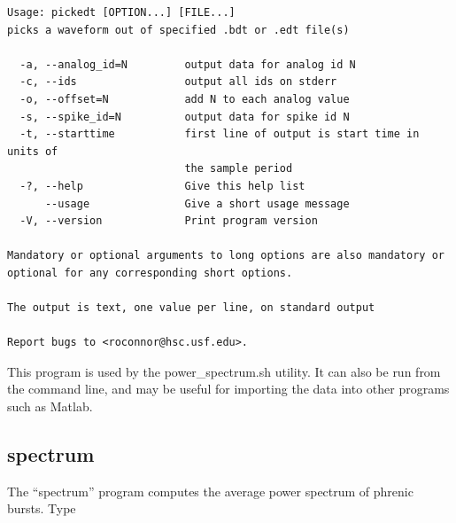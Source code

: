 \documentclass[12pt,openany,oneside]{book}
\newenvironment{ticartouche}{\begin{lrbox}{\savepar}
\begin{minipage}{.98\hsize}}
{\end{minipage}\end{lrbox}\noindent\fbox{\usebox{\savepar}}}
\begin{document}
\begin{ticartouche}
\begin{verbatim}
Usage: pickedt [OPTION...] [FILE...]
picks a waveform out of specified .bdt or .edt file(s)

  -a, --analog_id=N         output data for analog id N
  -c, --ids                 output all ids on stderr
  -o, --offset=N            add N to each analog value
  -s, --spike_id=N          output data for spike id N
  -t, --starttime           first line of output is start time in units of
                            the sample period
  -?, --help                Give this help list
      --usage               Give a short usage message
  -V, --version             Print program version

Mandatory or optional arguments to long options are also mandatory or
optional for any corresponding short options.

The output is text, one value per line, on standard output

Report bugs to <roconnor@hsc.usf.edu>.
\end{verbatim}
\end{ticartouche}

\noindent
This program is used by the power\_spectrum.sh utility.  It can also be
run from the command line, and may be useful for importing the data
into other programs such as Matlab.



\filbreak
\subsection{spectrum}

The ``spectrum'' program computes the average power spectrum of
phrenic bursts.  Type
\end{document}
